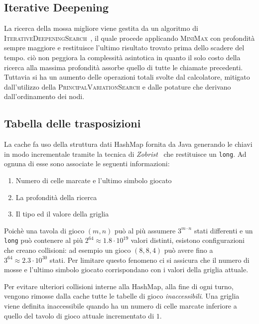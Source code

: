 \documentclass{article}
\begin{document}
\subsection{Iterative Deepening}

La ricerca della mossa migliore viene gestita da un algoritmo di
\textsc{IterativeDeepeningSearch}~\cite{id}, il quale procede applicando \textsc{MiniMax} 
con profondit\`a sempre maggiore e restituisce l'ultimo risultato trovato prima dello
scadere del tempo. \label{cost:id} ci\`o non peggiora la complessit\`a asintotica in quanto il
solo costo della ricerca alla massima profondit\`a assorbe quello di tutte
le chiamate precedenti. Tuttavia si ha un aumento delle operazioni totali svolte
dal calcolatore, mitigato dall'utilizzo della \textsc{PrincipalVariationSearch} 
e dalle potature che derivano dall'ordinamento dei nodi.

\subsection{Tabella delle trasposizioni}

La cache fa uso della struttura dati HashMap fornita da Java generando le chiavi 
in modo incrementale tramite la tecnica di \emph{Zobrist}~\cite{zobrist} che restituisce un \verb!long!. 
Ad ognuna di esse sono associate le seguenti informazioni:
\begin{enumerate}
  \item Numero di celle marcate e l'ultimo simbolo giocato
  \item La profondit\`a della ricerca
  \item Il tipo ed il valore della griglia
\end{enumerate}
Poich\`e una tavola di gioco $(m,n)$ pu\`o al pi\`u assumere $3^{m \cdot n}$ stati differenti e
un \verb!long! pu\`o contenere al pi\`u $2^{64} \approx 1.8 \cdot 10^{19}$ valori distinti,
esistono configurazioni che creano collisioni: ad esempio un gioco $(8, 8, 4)$
pu\`o avere fino a $3^{64} \approx 2.3 \cdot 10^{30}$ stati. Per limitare questo
fenomeno ci si assicura che il numero di mosse e l'ultimo simbolo giocato
corrispondano con i valori della griglia attuale.

Per evitare ulteriori collisioni interne alla HashMap, alla fine di ogni turno,
vengono rimosse dalla cache tutte le tabelle di gioco \emph{inaccessibili}.
Una griglia viene definita inaccessibile quando ha un numero di
celle marcate inferiore a quello del tavolo di gioco attuale incrementato di $1$.
\end{document}
